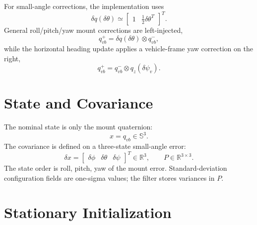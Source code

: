 \documentclass[11pt]{article}
\newcommand{\R}{\mathbb{R}}
\newcommand{\T}{^{T}}
\newcommand{\dq}{\delta q}
\begin{document}
For small-angle corrections, the implementation uses
\begin{equation}
  \dq(\delta\theta) \simeq
  \begin{bmatrix}1 & \frac{1}{2}\delta\theta\T\end{bmatrix}\T .
\end{equation}
General roll/pitch/yaw mount corrections are left-injected,
\begin{equation}
  q_{vb}^{+}=\dq(\delta\theta)\otimes q_{vb}^{-},
\end{equation}
while the horizontal heading update applies a vehicle-frame yaw correction on
the right,
\begin{equation}
  q_{vb}^{+}=q_{vb}^{-}\otimes q_z(\delta\psi_v).
\end{equation}

\section{State and Covariance}

The nominal state is only the mount quaternion:
\begin{equation}
  x = q_{vb}\in \mathbb{S}^{3}.
\end{equation}
The covariance is defined on a three-state small-angle error:
\begin{equation}
  \delta x =
  \begin{bmatrix}
  \delta\phi & \delta\theta & \delta\psi
  \end{bmatrix}\T \in \R^3,
  \qquad
  P\in\R^{3\times 3}.
\end{equation}
The state order is roll, pitch, yaw of the mount error. Standard-deviation
configuration fields are one-sigma values; the filter stores variances in \(P\).

\section{Stationary Initialization}
\end{document}
